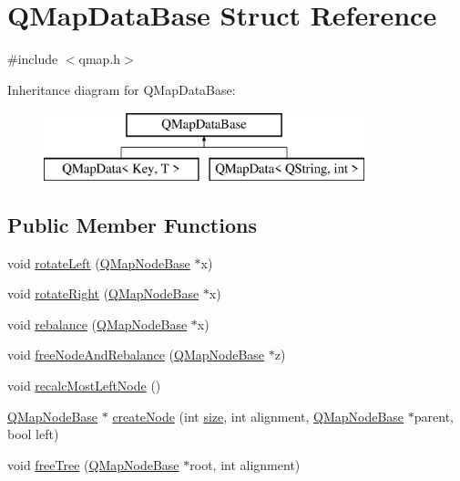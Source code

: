 \hypertarget{struct_q_map_data_base}{}\section{Q\+Map\+Data\+Base Struct Reference}
\label{struct_q_map_data_base}


{\ttfamily \#include $<$qmap.\+h$>$}

Inheritance diagram for Q\+Map\+Data\+Base\+:\begin{figure}[H]
\begin{center}
\leavevmode
\includegraphics[height=2.000000cm]{struct_q_map_data_base}
\end{center}
\end{figure}
\subsection*{Public Member Functions}
\begin{DoxyCompactItemize}
\item 
void \hyperlink{struct_q_map_data_base_affa79abf5995456a9cbf12a2306c8041}{rotate\+Left} (\hyperlink{struct_q_map_node_base}{Q\+Map\+Node\+Base} $\ast$x)
\item 
void \hyperlink{struct_q_map_data_base_a33a1fdcca7a3ddd4406e72cbeb71cf05}{rotate\+Right} (\hyperlink{struct_q_map_node_base}{Q\+Map\+Node\+Base} $\ast$x)
\item 
void \hyperlink{struct_q_map_data_base_a305bcd1ed005eed9f0e3a1478b7a022b}{rebalance} (\hyperlink{struct_q_map_node_base}{Q\+Map\+Node\+Base} $\ast$x)
\item 
void \hyperlink{struct_q_map_data_base_a141a896a0c94c46f9fcaa25ba8ba8bad}{free\+Node\+And\+Rebalance} (\hyperlink{struct_q_map_node_base}{Q\+Map\+Node\+Base} $\ast$z)
\item 
void \hyperlink{struct_q_map_data_base_ab24efe6e9bca4df9fba86b1b7382f0c0}{recalc\+Most\+Left\+Node} ()
\item 
\hyperlink{struct_q_map_node_base}{Q\+Map\+Node\+Base} $\ast$ \hyperlink{struct_q_map_data_base_ae681f8e156f10fef6238773ad833dc63}{create\+Node} (int \hyperlink{struct_q_map_data_base_a61b8b87aa9f55d8380f67b5b9f4bc786}{size}, int alignment, \hyperlink{struct_q_map_node_base}{Q\+Map\+Node\+Base} $\ast$parent, bool left)
\item 
void \hyperlink{struct_q_map_data_base_aa1e11406977158087b85d06b61fd64f8}{free\+Tree} (\hyperlink{struct_q_map_node_base}{Q\+Map\+Node\+Base} $\ast$root, int alignment)
\end{DoxyCompactItemize}
